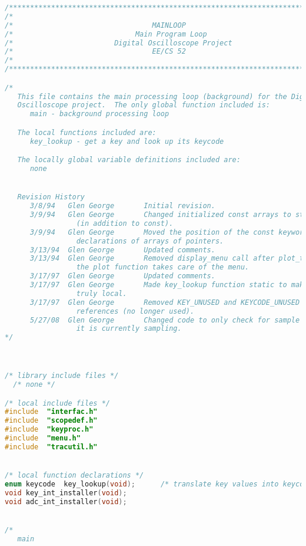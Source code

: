 \begin{lstlisting}[language=C]
/****************************************************************************/
/*                                                                          */
/*                                 MAINLOOP                                 */
/*                             Main Program Loop                            */
/*                        Digital Oscilloscope Project                      */
/*                                 EE/CS 52                                 */
/*                                                                          */
/****************************************************************************/

/*
   This file contains the main processing loop (background) for the Digital
   Oscilloscope project.  The only global function included is:
      main - background processing loop

   The local functions included are:
      key_lookup - get a key and look up its keycode

   The locally global variable definitions included are:
      none


   Revision History
      3/8/94   Glen George       Initial revision.
      3/9/94   Glen George       Changed initialized const arrays to static
				 (in addition to const).
      3/9/94   Glen George       Moved the position of the const keyword in
				 declarations of arrays of pointers.
      3/13/94  Glen George       Updated comments.
      3/13/94  Glen George       Removed display_menu call after plot_trace,
				 the plot function takes care of the menu.
      3/17/97  Glen George       Updated comments.
      3/17/97  Glen George       Made key_lookup function static to make it
				 truly local.
      3/17/97  Glen George       Removed KEY_UNUSED and KEYCODE_UNUSED
				 references (no longer used).
      5/27/08  Glen George       Changed code to only check for sample done if
				 it is currently sampling.
*/



/* library include files */
  /* none */

/* local include files */
#include  "interfac.h"
#include  "scopedef.h"
#include  "keyproc.h"
#include  "menu.h"
#include  "tracutil.h"


/* local function declarations */
enum keycode  key_lookup(void);      /* translate key values into keycodes */
void key_int_installer(void);
void adc_int_installer(void);


/*
   main


\end{lstlisting}

